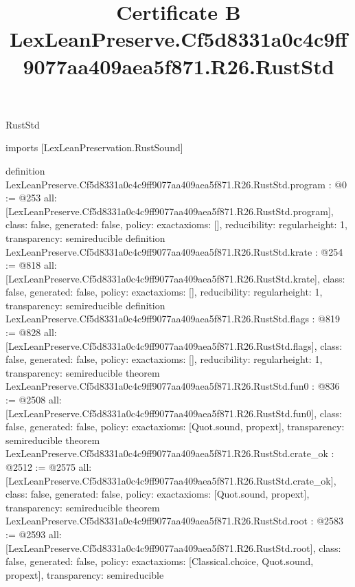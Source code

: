 \begin{lexlean}{RustStd}
\title{Certificate B LexLeanPreserve.Cf5d8331a0c4c9ff9077aa409aea5f871.R26.RustStd}
\begin{coremodule}
imports [LexLeanPreservation.RustSound]

definition LexLeanPreserve.Cf5d8331a0c4c9ff9077aa409aea5f871.R26.RustStd.program : @0 := @253 {
  all: [LexLeanPreserve.Cf5d8331a0c4c9ff9077aa409aea5f871.R26.RustStd.program],
  class: false,
  generated: false,
  policy: exact{axioms: []},
  reducibility: regular{height: 1},
  transparency: semireducible
}
definition LexLeanPreserve.Cf5d8331a0c4c9ff9077aa409aea5f871.R26.RustStd.krate : @254 := @818 {
  all: [LexLeanPreserve.Cf5d8331a0c4c9ff9077aa409aea5f871.R26.RustStd.krate],
  class: false,
  generated: false,
  policy: exact{axioms: []},
  reducibility: regular{height: 1},
  transparency: semireducible
}
definition LexLeanPreserve.Cf5d8331a0c4c9ff9077aa409aea5f871.R26.RustStd.flags : @819 := @828 {
  all: [LexLeanPreserve.Cf5d8331a0c4c9ff9077aa409aea5f871.R26.RustStd.flags],
  class: false,
  generated: false,
  policy: exact{axioms: []},
  reducibility: regular{height: 1},
  transparency: semireducible
}
theorem LexLeanPreserve.Cf5d8331a0c4c9ff9077aa409aea5f871.R26.RustStd.fun0 : @836 := @2508 {
  all: [LexLeanPreserve.Cf5d8331a0c4c9ff9077aa409aea5f871.R26.RustStd.fun0],
  class: false,
  generated: false,
  policy: exact{axioms: [Quot.sound, propext]},
  transparency: semireducible
}
theorem LexLeanPreserve.Cf5d8331a0c4c9ff9077aa409aea5f871.R26.RustStd.crate_ok : @2512 := @2575 {
  all: [LexLeanPreserve.Cf5d8331a0c4c9ff9077aa409aea5f871.R26.RustStd.crate_ok],
  class: false,
  generated: false,
  policy: exact{axioms: [Quot.sound, propext]},
  transparency: semireducible
}
theorem LexLeanPreserve.Cf5d8331a0c4c9ff9077aa409aea5f871.R26.RustStd.root : @2583 := @2593 {
  all: [LexLeanPreserve.Cf5d8331a0c4c9ff9077aa409aea5f871.R26.RustStd.root],
  class: false,
  generated: false,
  policy: exact{axioms: [Classical.choice, Quot.sound, propext]},
  transparency: semireducible
}


\end{coremodule}
\end{lexlean}
